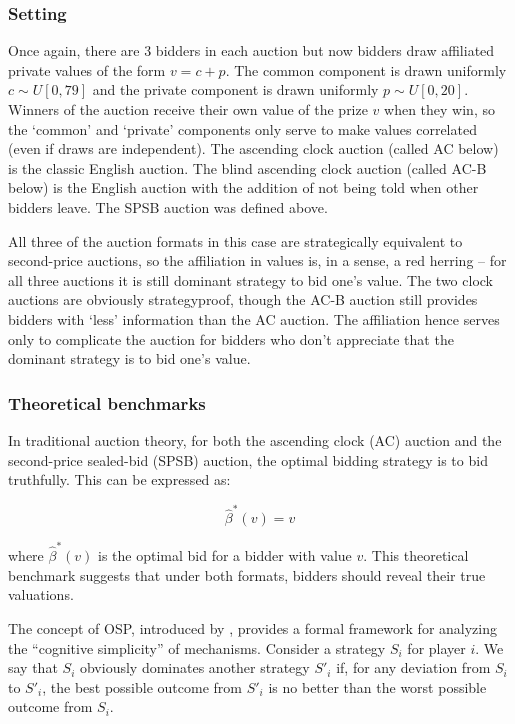 \documentclass{article} %
\begin{document}
\subsubsection{Setting}
Once again, there are $3$ bidders in each auction but now bidders draw affiliated private values of the form $v = c + p$. 
The common component is drawn uniformly $c \sim U[0, 79]$ and the private component is drawn uniformly $p \sim U[0, 20]$. 
Winners of the auction receive their own value of the prize $v$ when they win, so the `common' and `private' components only serve to make values correlated (even if draws are independent). 
The ascending clock auction (called AC below) is the classic English auction. 
The blind ascending clock auction (called AC-B below) is the English auction with the addition of not being told when other bidders leave. 
The SPSB auction was defined above. 

All three of the auction formats in this case are strategically equivalent to second-price auctions, so the affiliation in values is, in a sense, a red herring -- for all three auctions it is still dominant strategy to bid one's value. 
The two clock auctions are obviously strategyproof, though the AC-B auction still provides bidders with `less' information than the AC auction. 
The affiliation hence serves only to complicate the auction for bidders who don't appreciate that the dominant strategy is to bid one's value. 

\subsubsection{Theoretical benchmarks}

In traditional auction theory, for both the ascending clock (AC) auction and the second-price sealed-bid (SPSB) auction, the optimal bidding strategy is to bid truthfully. This can be expressed as:

\begin{equation}
    \hat{\beta}^*(v) = v
\end{equation}

where $\hat{\beta}^*(v)$ is the optimal bid for a bidder with value $v$. This theoretical benchmark suggests that under both formats, bidders should reveal their true valuations.

 The concept of OSP, introduced by \cite{li2017obviously}, provides a formal framework for analyzing the ``cognitive simplicity'' of mechanisms.
Consider a strategy $S_i$ for player $i$. 
We say that $S_i$ obviously dominates another strategy $S'_i$ if, for any deviation from $S_i$ to $S'_i$, the best possible outcome from $S'_i$ is no better than the worst possible outcome from $S_i$.
\end{document}
